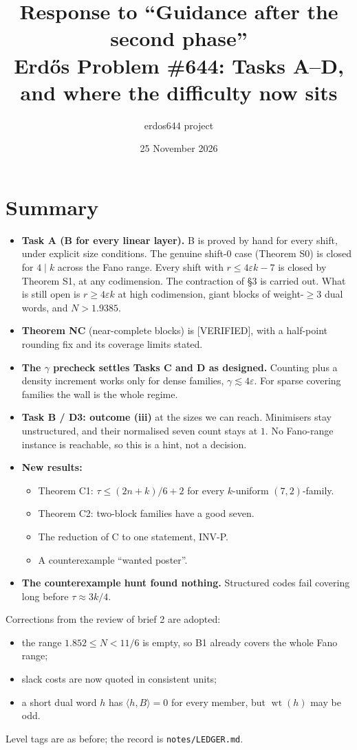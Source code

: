 \documentclass[11pt]{article}
\title{Response to ``Guidance after the second phase''\\[2pt]\large Erd\H{o}s Problem \#644: Tasks A--D, and where the
difficulty now sits}
\author{erdos644 project}
\date{25 November 2026}
\newcommand{\lvl}[1]{\textsf{\small[#1]}}
\begin{document}
\maketitle

\section*{Summary}
\begin{itemize}
\item \textbf{Task A (B for every linear layer).} B is proved by hand for every shift, under explicit size conditions. The
genuine shift-0 case (Theorem S0) is closed for $4\mid k$ across the Fano range. Every shift with $r\le4\varepsilon k-7$ is
closed by Theorem S1, at any codimension. The contraction of \S3 is carried out. What is still open is $r\ge4\varepsilon k$
at high codimension, giant blocks of weight-$\ge3$ dual words, and $N>1.9385$.
\item \textbf{Theorem NC} (near-complete blocks) is \lvl{VERIFIED}, with a half-point rounding fix and its coverage limits
stated.
\item \textbf{The $\gamma$ precheck settles Tasks C and D as designed.} Counting plus a density increment works only for dense
families, $\gamma\lesssim4\varepsilon$. For sparse covering families the wall is the whole regime.
\item \textbf{Task B / D3: outcome (iii)} at the sizes we can reach. Minimisers stay unstructured, and their normalised
seven count stays at $1$. No Fano-range instance is reachable, so this is a hint, not a decision.
\item \textbf{New results:}
  \begin{itemize}
  \item Theorem C1: $\tau\le(2n+k)/6+2$ for every $k$-uniform $(7,2)$-family.
  \item Theorem C2: two-block families have a good seven.
  \item The reduction of C to one statement, INV-P.
  \item A counterexample ``wanted poster''.
  \end{itemize}
\item \textbf{The counterexample hunt found nothing.} Structured codes fail covering long before $\tau\approx3k/4$.
\end{itemize}
Corrections from the review of brief 2 are adopted:
\begin{itemize}
\item the range $1.852\le N<11/6$ is empty, so B1 already covers the whole Fano range;
\item slack costs are now quoted in consistent units;
\item a short dual word $h$ has $\langle h,B\rangle=0$ for every member, but $\operatorname{wt}(h)$ may be odd.
\end{itemize}
Level tags are as before; the record is \texttt{notes/LEDGER.md}.
\end{document}
